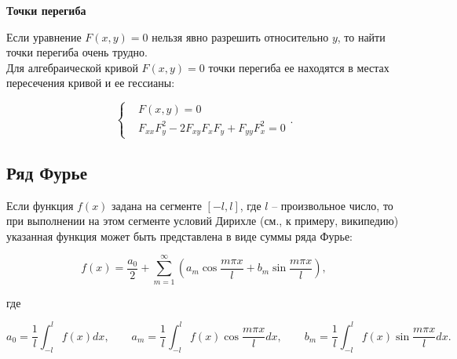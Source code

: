                 \textbf{Точки перегиба}

                    Если уравнение $F \left( x, y \right) = 0$ нельзя явно разрешить относительно $y$, то найти точки перегиба очень трудно.\\

                    Для алгебраической кривой $F \left( x, y \right) = 0$ точки перегиба ее находятся в местах пересечения кривой и ее гессианы:

                        \[
                            \begin{cases}
                                & F \left( x, y \right) = 0\\
                                & F_{xx} F^{2}_{y} - 2 F_{xy} F_{x} F_{y} + F_{yy} F^{2}_{x} = 0
                           \end{cases}.
                        \]

    \subsection{Ряд Фурье}

        Если функция $f(x)$ задана на сегменте $[-l,l]$, где $l$ -- произвольное число, то при выполнении на этом сегменте условий Дирихле (см., к примеру, википедию) указанная функция может быть представлена в виде суммы ряда Фурье:

        \[
            f(x) = \frac{a_{0}}{2} + \sum_{m = 1}^{\infty} \left( a_{m} \cos \frac{m \pi x}{l} + b_{m} \sin \frac{m \pi x}{l} \right),
        \]

        где

        \[
            a_{0} =  \frac{1}{l} \int_{-l}^{l} f(x) dx, \qquad a_{m} = \frac{1}{l} \int_{-l}^{l} f(x) \cos \frac{m \pi x}{l} dx, \qquad b_{m} = \frac{1}{l} \int_{-l}^{l} f(x) \sin \frac{m \pi x}{l} dx.
        \]
